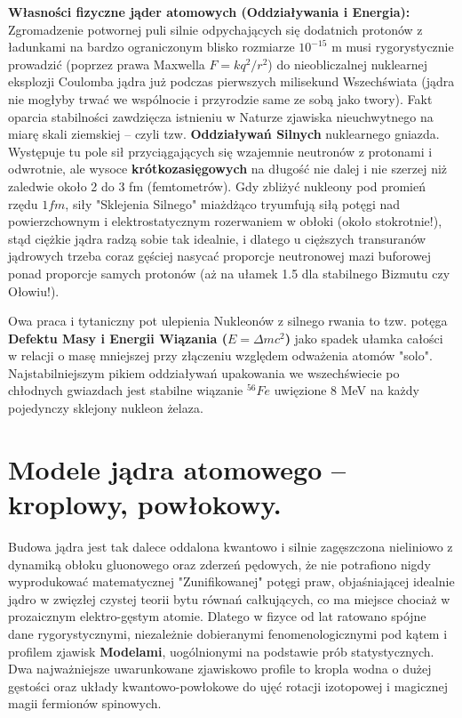 \documentclass[11pt, a4paper]{article}
\begin{document}
\textbf{Własności fizyczne jąder atomowych (Oddziaływania i Energia):}
Zgromadzenie potwornej puli silnie odpychających się dodatnich protonów z ładunkami na bardzo ograniczonym blisko rozmiarze $10^{-15}$ m musi rygorystycznie prowadzić (poprzez prawa Maxwella $F = kq^2/r^2$) do nieobliczalnej nuklearnej eksplozji Coulomba jądra już podczas pierwszych milisekund Wszechświata (jądra nie mogłyby trwać we wspólnocie i przyrodzie same ze sobą jako twory).
Fakt oparcia stabilności zawdzięcza istnieniu w Naturze zjawiska nieuchwytnego na miarę skali ziemskiej – czyli tzw. \textbf{Oddziaływań Silnych} nuklearnego gniazda. Występuje tu pole sił przyciągających się wzajemnie neutronów z protonami i odwrotnie, ale wysoce \textbf{krótkozasięgowych} na długość nie dalej i nie szerzej niż zaledwie około 2 do 3 fm (femtometrów). Gdy zbliżyć nukleony pod promień rzędu $1 fm$, siły "Sklejenia Silnego" miażdżąco tryumfują siłą potęgi nad powierzchownym i elektrostatycznym rozerwaniem w obłoki (około stokrotnie!), stąd ciężkie jądra radzą sobie tak idealnie, i dlatego u cięższych transuranów jądrowych trzeba coraz gęściej nasycać proporcje neutronowej mazi buforowej ponad proporcje samych protonów (aż na ułamek 1.5 dla stabilnego Bizmutu czy Ołowiu!).

Owa praca i tytaniczny pot ulepienia Nukleonów z silnego rwania to tzw. potęga \textbf{Defektu Masy i Energii Wiązania ($E = \Delta m c^2$)} jako spadek ułamka całości w relacji o masę mniejszej przy złączeniu względem odważenia atomów "solo". Najstabilniejszym pikiem oddziaływań upakowania we wszechświecie po chłodnych gwiazdach jest stabilne wiązanie ${}^{56}Fe$ uwięzione 8 MeV na każdy pojedynczy sklejony nukleon żelaza.

\section{Modele jądra atomowego – kroplowy, powłokowy.}

Budowa jądra jest tak dalece oddalona kwantowo i silnie zagęszczona nieliniowo z dynamiką obłoku gluonowego oraz zderzeń pędowych, że nie potrafiono nigdy wyprodukować matematycznej "Zunifikowanej" potęgi praw, objaśniającej idealnie jądro w zwięzłej czystej teorii bytu równań całkujących, co ma miejsce chociaż w prozaicznym elektro-gęstym atomie. Dlatego w fizyce od lat ratowano spójne dane rygorystycznymi, niezależnie dobieranymi fenomenologicznymi pod kątem i profilem zjawisk \textbf{Modelami}, uogólnionymi na podstawie prób statystycznych. Dwa najważniejsze uwarunkowane zjawiskowo profile to kropla wodna o dużej gęstości oraz układy kwantowo-powłokowe do ujęć rotacji izotopowej i magicznej magii fermionów spinowych.
\end{document}
